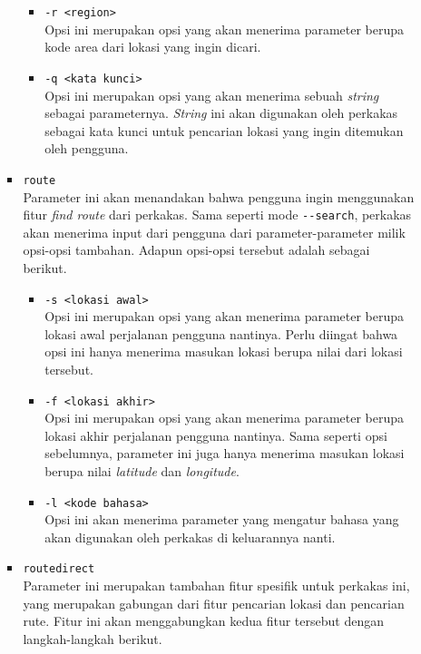 \documentclass[a4paper,twoside]{article}
\begin{document}
\begin{enumerate}
\begin{itemize}
\begin{itemize}
		\begin{itemize}
			\item \verb|-r <region>|\\
			Opsi ini merupakan opsi yang akan menerima parameter berupa kode area dari lokasi yang ingin dicari.
			\item \verb|-q <kata kunci>|\\
			Opsi ini merupakan opsi yang akan menerima sebuah \textit{string} sebagai parameternya. \textit{String} ini akan digunakan oleh perkakas sebagai kata kunci untuk pencarian lokasi yang ingin ditemukan oleh pengguna.
		\end{itemize}
	
		\item \verb|route|\\
		Parameter ini akan menandakan bahwa pengguna ingin menggunakan fitur \textit{find route} dari perkakas. Sama seperti mode \verb|--search|, perkakas akan menerima input dari pengguna dari parameter-parameter milik opsi-opsi tambahan. Adapun opsi-opsi tersebut adalah sebagai berikut.
		
		\begin{itemize}
			\item \verb|-s <lokasi awal>|\\
			Opsi ini merupakan opsi yang akan menerima parameter berupa lokasi awal perjalanan pengguna nantinya. Perlu diingat bahwa opsi ini hanya menerima masukan lokasi berupa nilai \latlon dari lokasi tersebut.
			\item \verb|-f <lokasi akhir>|\\
			Opsi ini merupakan opsi yang akan menerima parameter berupa lokasi akhir perjalanan pengguna nantinya. Sama seperti opsi sebelumnya, parameter ini juga hanya menerima masukan lokasi berupa nilai \textit{latitude} dan \textit{longitude}.
			\item \verb|-l <kode bahasa>|\\
			Opsi ini akan menerima parameter yang mengatur bahasa yang akan digunakan oleh perkakas di keluarannya nanti.
		\end{itemize}
		
		\item \verb|routedirect|\\
		Parameter ini merupakan tambahan fitur spesifik untuk perkakas ini, yang merupakan gabungan dari fitur pencarian lokasi dan pencarian rute. Fitur ini akan menggabungkan kedua fitur tersebut dengan langkah-langkah berikut.
		

\end{itemize}
\end{itemize}
\end{enumerate}
\end{document}
